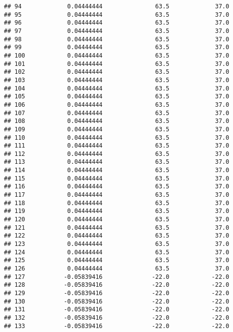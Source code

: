 \documentclass[]{article}
\begin{document}
\begin{verbatim}
## 94             0.04444444               63.5             37.0
## 95             0.04444444               63.5             37.0
## 96             0.04444444               63.5             37.0
## 97             0.04444444               63.5             37.0
## 98             0.04444444               63.5             37.0
## 99             0.04444444               63.5             37.0
## 100            0.04444444               63.5             37.0
## 101            0.04444444               63.5             37.0
## 102            0.04444444               63.5             37.0
## 103            0.04444444               63.5             37.0
## 104            0.04444444               63.5             37.0
## 105            0.04444444               63.5             37.0
## 106            0.04444444               63.5             37.0
## 107            0.04444444               63.5             37.0
## 108            0.04444444               63.5             37.0
## 109            0.04444444               63.5             37.0
## 110            0.04444444               63.5             37.0
## 111            0.04444444               63.5             37.0
## 112            0.04444444               63.5             37.0
## 113            0.04444444               63.5             37.0
## 114            0.04444444               63.5             37.0
## 115            0.04444444               63.5             37.0
## 116            0.04444444               63.5             37.0
## 117            0.04444444               63.5             37.0
## 118            0.04444444               63.5             37.0
## 119            0.04444444               63.5             37.0
## 120            0.04444444               63.5             37.0
## 121            0.04444444               63.5             37.0
## 122            0.04444444               63.5             37.0
## 123            0.04444444               63.5             37.0
## 124            0.04444444               63.5             37.0
## 125            0.04444444               63.5             37.0
## 126            0.04444444               63.5             37.0
## 127           -0.05839416              -22.0            -22.0
## 128           -0.05839416              -22.0            -22.0
## 129           -0.05839416              -22.0            -22.0
## 130           -0.05839416              -22.0            -22.0
## 131           -0.05839416              -22.0            -22.0
## 132           -0.05839416              -22.0            -22.0
## 133           -0.05839416              -22.0            -22.0

\end{verbatim}
\end{document}
